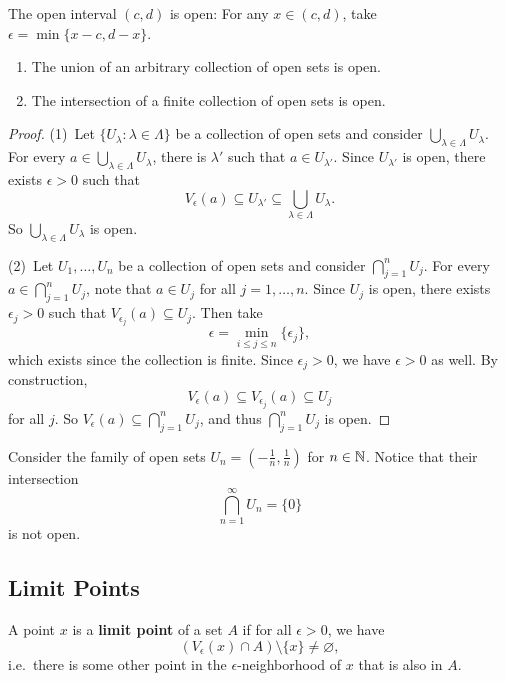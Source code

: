\begin{example}
  The open interval $(c, d)$ is open: For any
  $x \in (c, d)$, take $\epsilon = \min\{x - c, d - x\}$.
\end{example}

\begin{theorem}\leavevmode
  \begin{enumerate}
    \item The union of an arbitrary collection of open sets
      is open.
    \item The intersection of a finite collection of
      open sets is open.
  \end{enumerate}
\end{theorem}

\begin{proof}
  (1)\, Let $\{U_\lambda : \lambda \in \Lambda\}$ be a
  collection of open sets and consider
  $\bigcup_{\lambda \in \Lambda} U_\lambda$. For
  every $a \in \bigcup_{\lambda \in \Lambda} U_\lambda$,
  there is $\lambda'$ such that $a \in U_{\lambda'}$.
  Since $U_{\lambda'}$ is open, there exists
  $\epsilon > 0$ such that
  \[V_\epsilon(a) \subseteq U_{\lambda'} \subseteq \bigcup_{\lambda \in \Lambda} U_\lambda.\]
  So $\bigcup_{\lambda \in \Lambda} U_\lambda$ is open.

  (2)\, Let $U_1, \ldots, U_n$ be a collection of
  open sets and consider $\bigcap_{j = 1}^n U_j$.
  For every $a \in \bigcap_{j = 1}^n U_j$, note that
  $a \in U_j$ for all $j = 1, \ldots, n$. Since
  $U_j$ is open, there exists $\epsilon_j > 0$ such that
  $V_{\epsilon_j}(a) \subseteq U_j$. Then take
  \[\epsilon = \min_{i \le j \le n}\{\epsilon_j\},\]
  which exists since the collection is finite.
  Since $\epsilon_j > 0$, we have $\epsilon > 0$ as well.
  By construction,
  \[V_\epsilon(a) \subseteq V_{\epsilon_j}(a) \subseteq U_j\]
  for all $j$. So
  $V_\epsilon(a) \subseteq \bigcap_{j = 1}^n U_j$, and
  thus $\bigcap_{j = 1}^n U_j$ is open.
\end{proof}

\begin{example}
  Consider the family of open sets
  $U_n = (-\frac{1}{n}, \frac{1}{n})$ for $n \in \mathbb{N}$. Notice
  that their intersection
  \[\bigcap_{n = 1}^\infty U_n = \{0\}\]
  is not open.
\end{example}

\subsection{Limit Points}
\begin{definition}
  A point $x$ is a \textbf{limit point} of a set
  $A$ if for all $\epsilon > 0$, 
  we have
  \[(V_\epsilon(x) \cap A) \setminus \{x\} \ne \varnothing,\]
  i.e.~there is some other point in the
  $\epsilon$-neighborhood of $x$ that is also in $A$.
\end{definition}

